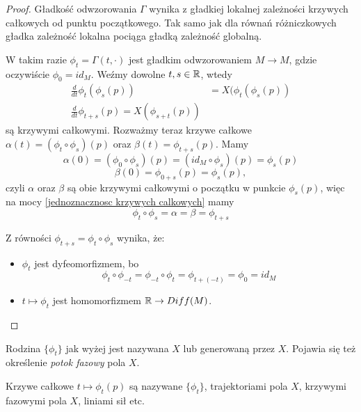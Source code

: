 \begin{proof}
  Gładkość odwzorowania $\Gamma$ wynika z gładkiej lokalnej zależności krzywych całkowych od punktu początkowego. Tak samo jak dla równań różniczkowych gładka zależność lokalna pociąga gładką zależność globalną.

  W takim razie $\phi_t=\Gamma(t, \cdot)$ jest gładkim odwzorowaniem $M\to M$, gdzie oczywiście $\phi_0=id_M$. Weźmy dowolne $t,s\in\mathbb{R}$, wtedy
  \begin{align*}
    \frac{d}{dt}\phi_t(\phi_s(p))&=X(\phi_t(\phi_s(p))\\
    \frac{d}{dt}\phi_{t+s}(p)=X(\phi_{s+t}(p))
  \end{align*}
  są krzywymi całkowymi. Rozważmy teraz krzywe całkowe $\alpha(t)=(\phi_t\circ\phi_s)(p)$ oraz $\beta(t)=\phi_{t+s}(p)$. Mamy
  $$\alpha(0)=(\phi_0\circ\phi_s)(p)=(id_M\circ\phi_s)(p)=\phi_s(p)$$
  $$\beta(0)=\phi_{0+s}(p)=\phi_s(p),$$
  czyli $\alpha$ oraz $\beta$ są obie krzywymi całkowymi o początku w punkcie $\phi_s(p)$, więc na mocy \ref{jednoznacznosc krzywych calkowych} mamy
  $$\phi_t\circ\phi_s=\alpha=\beta=\phi_{t+s}$$

  Z równości $\phi_{t+s}=\phi_t\circ\phi_s$ wynika, że:
  \begin{itemize}
    \item $\phi_t$ jest dyfeomorfizmem, bo 
      $$\phi_t\circ\phi_{-t}=\phi_{-t}\circ\phi_t=\phi_{t+(-t)}=\phi_0=id_M$$
    \item $t\mapsto \phi_t$ jest homomorfizmem $\mathbb{R}\to Diff(M)$.
  \end{itemize}
\end{proof}

  Rodzina $\{\phi_t\}$ jak wyżej jest nazywana  $X$ lub  generowaną przez $X$. Pojawia się też określenie \emph{potok fazowy} pola $X$.

  Krzywe całkowe $t\mapsto \phi_t(p)$ są nazywane  $\{\phi_t\}$, trajektoriami pola $X$, krzywymi fazowymi pola $X$, liniami sił etc.

